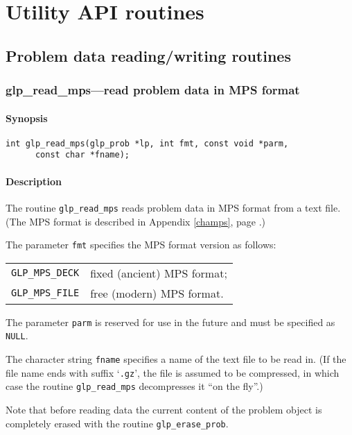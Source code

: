 
\chapter{Utility API routines}

\section{Problem data reading/writing routines}

\subsection{glp\_read\_mps---read problem data in MPS format}

\subsubsection*{Synopsis}

\begin{verbatim}
int glp_read_mps(glp_prob *lp, int fmt, const void *parm,
      const char *fname);
\end{verbatim}

\subsubsection*{Description}

The routine \verb|glp_read_mps| reads problem data in MPS format from a
text file. (The MPS format is described in Appendix \ref{champs}, page
\pageref{champs}.)

The parameter \verb|fmt| specifies the MPS format version as follows:

\begin{tabular}{@{}ll}
\verb|GLP_MPS_DECK| & fixed (ancient) MPS format; \\
\verb|GLP_MPS_FILE| & free (modern) MPS format. \\
\end{tabular}

The parameter \verb|parm| is reserved for use in the future and must be
specified as \verb|NULL|.

The character string \verb|fname| specifies a name of the text file to
be read in. (If the file name ends with suffix `\verb|.gz|', the file is
assumed to be compressed, in which case the routine \verb|glp_read_mps|
decompresses it ``on the fly''.)

Note that before reading data the current content of the problem object
is completely erased with the routine \verb|glp_erase_prob|.

